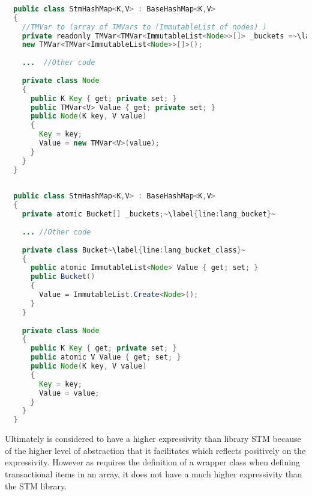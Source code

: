 \begin{lstlisting}[label=lst:lib_Buckets,
  caption={HashMap Buckets Array - \ac{STM} Library},
  language=Java,  
  showspaces=false,
  showtabs=false,
  breaklines=true,
  showstringspaces=false,
  breakatwhitespace=true,
  escapechar=~,
  commentstyle=\color{greencomments},
  keywordstyle=\color{bluekeywords},
  stringstyle=\color{redstrings},
  morekeywords={atomic, retry, orelse, var, get, set, ref, out}]  % Start your code-block
  
  public class StmHashMap<K,V> : BaseHashMap<K,V>
  {
    //TMVar to (array of TMVars to (ImmutableList of nodes) )
    private readonly TMVar<TMVar<ImmutableList<Node>>[]> _buckets =~\label{line:lib_bucket}~
    new TMVar<TMVar<ImmutableList<Node>>[]>();
  
    ...  //Other code
  
    private class Node
    {
      public K Key { get; private set; }
      public TMVar<V> Value { get; private set; }
      public Node(K key, V value)
      {
        Key = key;
        Value = new TMVar<V>(value);
      }
    }
  }
\end{lstlisting}

\begin{lstlisting}[label=lst:lang_Buckets,
  caption={HashMap Buckets Array - \stmname},
  language=Java,  
  showspaces=false,
  showtabs=false,
  breaklines=true,
  showstringspaces=false,
  breakatwhitespace=true,
  escapechar=~,
  commentstyle=\color{greencomments},
  keywordstyle=\color{bluekeywords},
  stringstyle=\color{redstrings},
  morekeywords={atomic, retry, orelse, var, get, set, ref, out}]  % Start your code-block
  
  public class StmHashMap<K,V> : BaseHashMap<K,V>
  {
    private atomic Bucket[] _buckets;~\label{line:lang_bucket}~
  
    ... //Other code
    
    private class Bucket~\label{line:lang_bucket_class}~
    {
      public atomic ImmutableList<Node> Value { get; set; }
      public Bucket()
      {
        Value = ImmutableList.Create<Node>();
      }
    }
  
    private class Node
    {
      public K Key { get; private set; }
      public atomic V Value { get; set; }
      public Node(K key, V value)
      {
        Key = key;
        Value = value;
      }
    }
  }
\end{lstlisting}

Ultimately \stmname is considered to have a higher expressivity than library \ac{STM} because of the higher level of abstraction that it facilitates which reflects positively on the expressivity. However as \stmname requires the definition of a wrapper class when defining transactional items in an array, it does not have a much higher expressivity than the \ac{STM} library.

